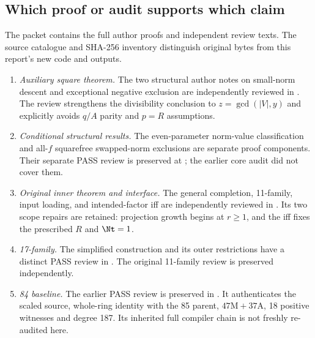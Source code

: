\documentclass[11pt,letterpaper]{article}
\theoremstyle{definition}\newtheorem{definition}[theorem]{Definition}
\theoremstyle{remark}\newtheorem{remark}[theorem]{Remark}
\begin{document}
\subsection{Which proof or audit supports which claim}
The packet contains the full author proofs and independent review texts.
The source catalogue and SHA-256 inventory distinguish original bytes
from this report's new code and outputs.
\begin{enumerate}
\item \emph{Auxiliary square theorem.} The two structural author notes
on small-norm descent and exceptional negative exclusion are independently
reviewed in . The review strengthens
the divisibility conclusion to $z=\gcd(|V|,y)$ and explicitly avoids
$q/A$ parity and $p=R$ assumptions.
\item \emph{Conditional structural results.} The even-parameter norm-value
classification and all-$f$ squarefree swapped-norm exclusions are separate
proof components. Their separate PASS review is preserved at
; the earlier core audit did
not cover them.
\item \emph{Original inner theorem and interface.} The general completion,
11-family, input loading, and intended-factor iff are independently
reviewed in . Its two scope repairs
are retained: projection growth begins at $r\ge1$, and the iff fixes the
prescribed $R$ and $\Nt=1$.
\item \emph{17-family.} The simplified construction and its outer
restrictions have a distinct PASS review in
. The original 11-family review
is preserved independently.
\item \emph{84 baseline.} The earlier PASS review is preserved in
. It authenticates the scaled source,
whole-ring identity with the 85 parent, $47\mathrm M+37\mathrm A$,
18 positive witnesses and degree 187. Its inherited full compiler chain
is not freshly re-audited here.
\end{enumerate}
\end{document}
